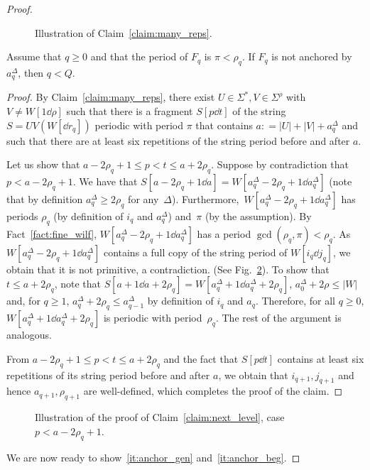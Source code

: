 \begin{proof}
\begin{figure}[ht!]
\centering
{}
\caption{Illustration of Claim~\ref{claim:many_reps}.}
\label{fig:claim_many_reps}
\end{figure}

\begin{claim}\label{claim:next_level}
Assume that $q \ge 0$ and that the period of $F_q$ is $\pi < \rho_q$. If $F_q$ is not anchored by $a_q^\Delta$, then $q < Q$. 
\end{claim}
\begin{proof}
By Claim~\ref{claim:many_reps}, there exist $U \in \Sigma^\ast, V \in \Sigma^\rho$ with $V \neq W[1 \dd \rho]$ such that there is a fragment $S[p \dd t]$ of the string $S = UV(W[\dd r_q])$ periodic with period $\pi$ that contains $a: = |U|+|V|+a_q^\Delta$ and such that there are at least six repetitions of the string period before and after $a$.

Let us show that $a-2\rho_q+1 \le p < t \le a+2\rho_q$. Suppose by contradiction that $p < a-2\rho_q+1$. We have that $S[a-2\rho_q+1 \dd a] = W[a_q^\Delta-2\rho_q+1 \dd a_q^\Delta]$ (note that by definition $a_q^\Delta \ge 2 \rho_q$ for any~$\Delta$). Furthermore,~$W[a_q^\Delta-2\rho_q+1 \dd a_q^\Delta]$ has periods $\rho_q$ (by definition of $i_q$ and $a_q^\Delta$) and~$\pi$ (by the assumption). By Fact~\ref{fact:fine_wilf}, $W[a_q^\Delta-2\rho_q+1 \dd a_q^\Delta]$ has a period $\gcd(\rho_q, \pi) < \rho_q$. As $W[a_q^\Delta-2\rho_q+1 \dd a_q^\Delta]$ contains a full copy of the string period of $W[i_q \dd j_q]$, we obtain that it is not primitive, a contradiction. (See Fig.~\ref{fig:claim_next_level}). To show that~$t \le a+2\rho_q$, note that $S[a+1 \dd a+2\rho_q] = W[a_q^\Delta+1 \dd a_q^\Delta+2\rho_q]$, $a_0^\Delta+2\rho \le |W|$ and, for $q\ge 1$, $a_q^\Delta+2\rho_q \le a_{q-1}^\Delta$ by definition of $i_q$ and $a_q$. Therefore, for all $q \ge 0$, $W[a_q^\Delta+1 \dd a_q^\Delta+2\rho_q]$ is periodic with period~$\rho_q$. The rest of the argument is analogous. 

From $a-2\rho_q+1 \le p < t \le a+2\rho_q$ and the fact that $S[p \dd t]$ contains at least six repetitions of its string period before and after $a$, we obtain that $i_{q+1}, j_{q+1}$ and hence $a_{q+1}, \rho_{q+1}$ are well-defined, which completes the proof of the claim.  
\end{proof}

\begin{figure}
\centering
{}
\caption{Illustration of the proof of Claim~\ref{claim:next_level}, case $p < a-2\rho_q+1$.}
\label{fig:claim_next_level}
\end{figure}
\noindent
We are now ready to show~\ref{it:anchor_gen} and~\ref{it:anchor_beg}. 


\end{proof}
